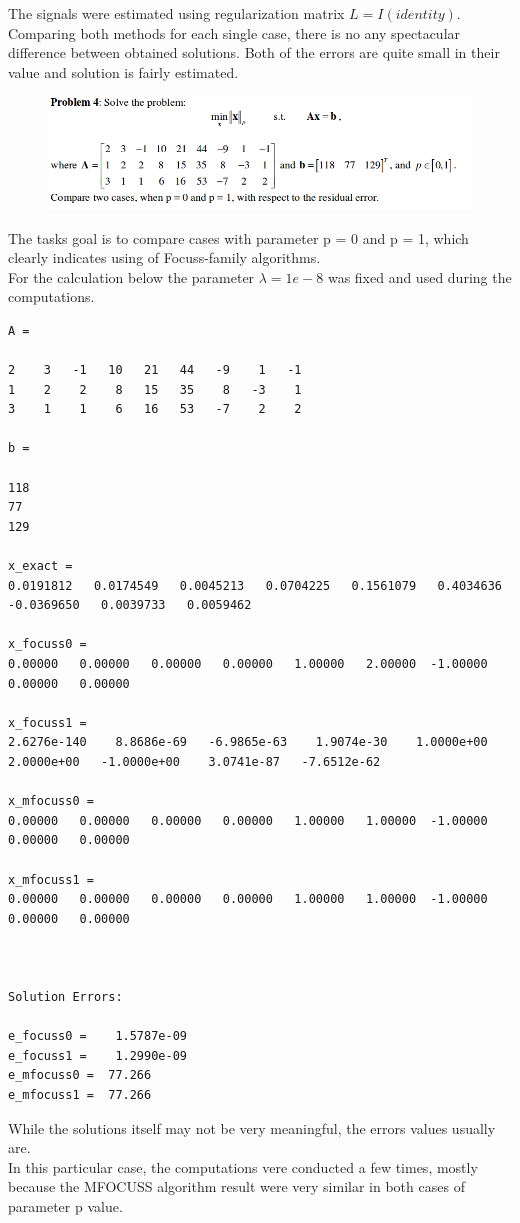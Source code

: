 \documentclass[eng,openany]{mgr}
\begin{document}
The signals were estimated using regularization matrix $L = I (identity)$. \\Comparing both methods for each single case, there is no any spectacular difference between obtained solutions. Both of the errors are quite small in their value and solution is fairly estimated.
\newpage
\begin{figure}[h]
\centering
\includegraphics[width=0.7\linewidth]{screenshot004}
\label{fig:screenshot004}
\end{figure}
The tasks goal is to compare cases with parameter p = 0 and p = 1, which clearly indicates using of Focuss-family algorithms.\\
For the calculation below the parameter $\lambda = 1e-8$ was fixed and used during the computations.

\begin{lstlisting}
A =

2    3   -1   10   21   44   -9    1   -1
1    2    2    8   15   35    8   -3    1
3    1    1    6   16   53   -7    2    2

b =

118
77
129

x_exact =
0.0191812   0.0174549   0.0045213   0.0704225   0.1561079   0.4034636  -0.0369650   0.0039733   0.0059462

x_focuss0 =
0.00000   0.00000   0.00000   0.00000   1.00000   2.00000  -1.00000   0.00000   0.00000

x_focuss1 =
2.6276e-140    8.8686e-69   -6.9865e-63    1.9074e-30    1.0000e+00    2.0000e+00   -1.0000e+00    3.0741e-87   -7.6512e-62

x_mfocuss0 =
0.00000   0.00000   0.00000   0.00000   1.00000   1.00000  -1.00000   0.00000   0.00000

x_mfocuss1 =
0.00000   0.00000   0.00000   0.00000   1.00000   1.00000  -1.00000   0.00000   0.00000



Solution Errors:

e_focuss0 =    1.5787e-09
e_focuss1 =    1.2990e-09
e_mfocuss0 =  77.266
e_mfocuss1 =  77.266
\end{lstlisting}
While the solutions itself may not be very meaningful, the errors values usually are.\\
In this particular case, the computations vere conducted a few times, mostly because the MFOCUSS algorithm result were very similar in both cases of parameter p value.
\end{document}
